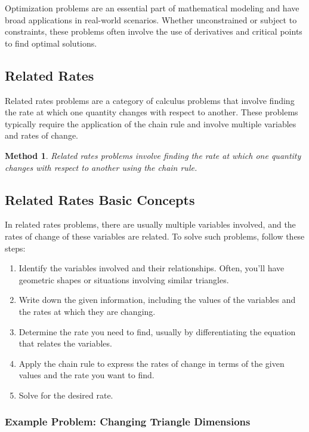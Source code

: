 \documentclass[a4paper,12pt]{book}
\newcounter{problem}
\newtheorem{method}{Method}
\begin{document}
Optimization problems are an essential part of mathematical modeling and have broad applications in real-world scenarios. Whether unconstrained or subject to constraints, these problems often involve the use of derivatives and critical points to find optimal solutions.

\subsection{Related Rates}

Related rates problems are a category of calculus problems that involve finding the rate at which one quantity changes with respect to another. These problems typically require the application of the chain rule and involve multiple variables and rates of change.

\begin{method}
Related rates problems involve finding the rate at which one quantity changes with respect to another using the chain rule.
\end{method}

\subsection{Related Rates Basic Concepts}

In related rates problems, there are usually multiple variables involved, and the rates of change of these variables are related. To solve such problems, follow these steps:

\begin{enumerate}
  \item Identify the variables involved and their relationships. Often, you'll have geometric shapes or situations involving similar triangles.
  \item Write down the given information, including the values of the variables and the rates at which they are changing.
  \item Determine the rate you need to find, usually by differentiating the equation that relates the variables.
  \item Apply the chain rule to express the rates of change in terms of the given values and the rate you want to find.
  \item Solve for the desired rate.
\end{enumerate}

\subsubsection*{Example Problem: Changing Triangle Dimensions}
\end{document}
